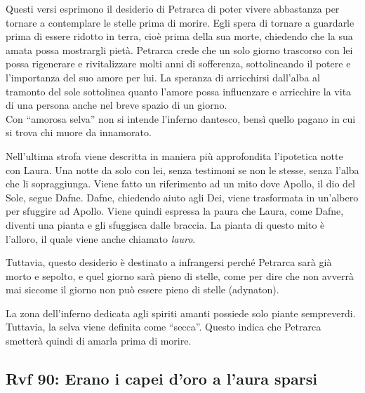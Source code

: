 \documentclass[a4paper]{article}
\newcommand*\circled[1]{\tikz[baseline=(char.base)]{
            \node[shape=circle,draw,inner sep=2pt] (char) {#1};}}
\newcommand{\quotes}[1]{``#1''}
\begin{document}
\circled{5} Questi versi esprimono il desiderio di Petrarca di poter vivere abbastanza
per tornare a contemplare le stelle prima di morire.
Egli spera di tornare a guardarle prima di essere ridotto in terra,
cioè prima della sua morte, chiedendo che la sua amata possa mostrargli pietà.
Petrarca crede che un solo giorno trascorso con lei possa rigenerare e rivitalizzare
molti anni di sofferenza, sottolineando il potere e l'importanza del suo amore per lui.
La speranza di arricchirsi dall'alba al tramonto del sole sottolinea quanto l'amore possa
influenzare e arricchire la vita di una persona anche nel breve spazio di un giorno. \\
Con \quotes{amorosa selva} non si intende l'inferno dantesco, bensì quello pagano in cui
si trova chi muore da innamorato.

\pagebreak

\circled{6} Nell'ultima strofa viene descritta in maniera più approfondita l'ipotetica notte con Laura.
Una notte da solo con lei, senza testimoni se non le stesse, senza l'alba che li sopraggiunga.
Viene fatto un riferimento ad un mito dove Apollo, il dio del Sole, segue Dafne.
Dafne, chiedendo aiuto agli Dei, viene trasformata in un'albero per sfuggire ad Apollo.
Viene quindi espressa la paura che Laura, come Dafne, diventi una pianta e gli sfuggisca dalle braccia.
La pianta di questo mito è l'alloro, il quale viene anche chiamato \textit{lauro}.

\circled{7} Tuttavia, questo desiderio è destinato a infrangersi perché Petrarca sarà già morto
e sepolto, e quel giorno sarà pieno di stelle, come per dire che non avverrà mai siccome
il giorno non può essere pieno di stelle (adynaton).


La zona dell'inferno dedicata agli spiriti amanti possiede solo piante sempreverdi.
Tuttavia, la selva viene definita come \quotes{secca}.
Questo indica che Petrarca smetterà quindi di amarla prima di morire.

\pagebreak

\subsection{Rvf 90: Erano i capei d'oro a l'aura sparsi}
\end{document}
